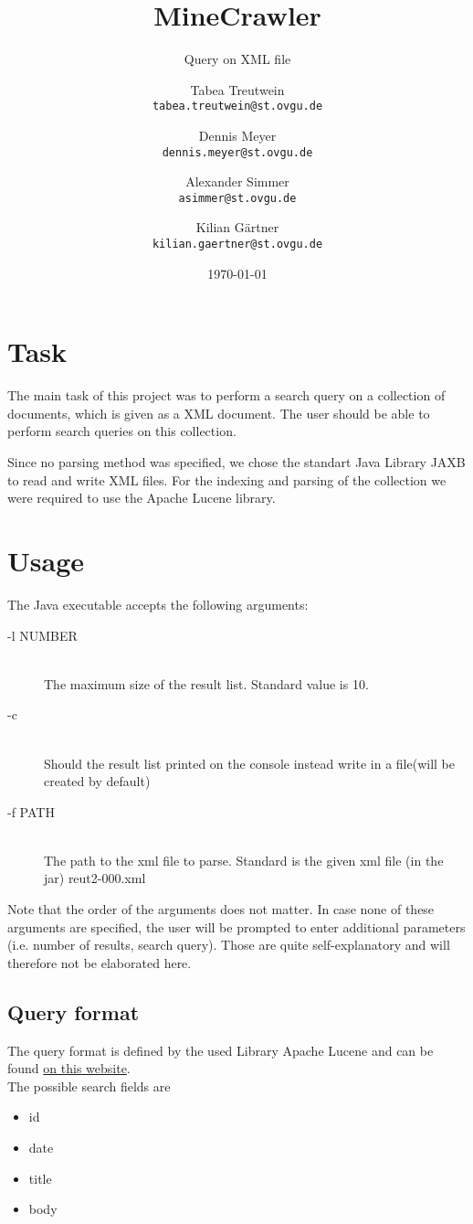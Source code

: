 \documentclass{scrartcl}
\title{MineCrawler}
\subtitle{Query on XML file}
\author{
  Tabea Treutwein\\
  \texttt{tabea.treutwein@st.ovgu.de}\\
  \and
  Dennis Meyer\\
  \texttt{dennis.meyer@st.ovgu.de}\\
  \and
  Alexander Simmer\\
  \texttt{asimmer@st.ovgu.de}\\
  \and
  Kilian Gärtner\\
  \texttt{kilian.gaertner@st.ovgu.de}\\
}
\date{\today}
\begin{document}
\maketitle
 
\section{Task}
The main task of this project was to perform a search query on a collection of documents, which is given as a XML document. The user should be able to perform search queries on this collection.

Since no parsing method was specified, we chose the standart Java Library JAXB to read and write XML files. For the indexing and parsing of the collection we were required to use the Apache Lucene library.

\section{Usage}
The Java executable accepts the following arguments:

\begin{description}
  \item[-l NUMBER] \hfill \\
  The maximum size of the result list. Standard value is 10.
  \item[-c] \hfill \\
  Should the result list printed on the console instead write in a file(will be created by default)
  \item[-f PATH] \hfill \\
  The path to the xml file to parse. Standard is the given xml file (in the jar) reut2-000.xml
\end{description}

Note that the order of the arguments does not matter. In case none of these arguments are specified, the user will be prompted to enter additional parameters (i.e. number of results, search query). Those are quite self-explanatory and will therefore not be elaborated here.

\subsection{Query format}
The query format is defined by the used Library Apache Lucene and can be found \href{http://lucene.apache.org/core/4_6_0/queryparser/org/apache/lucene/queryparser/classic/package-summary.html#package_description}{on this website}.  \\
The possible search fields are 
\begin{itemize}
	\item id
	\item date
	\item title
	\item body
\end{itemize}
\end{document}
